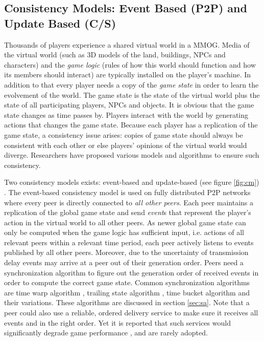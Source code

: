 \documentclass{article}
\begin{document}
\subsection{Consistency Models: Event Based (P2P) and Update Based (C/S)}
\label{sec:cm}
Thousands of players experience a shared virtual world in a MMOG. Media of the virtual world (such as 3D models of the land, buildings, NPCs and characters) and the \emph{game logic} (rules of how this world should function and how its members should interact) are typically installed on the player's machine. In addition to that every player needs a copy of the \emph{game state} in order to learn the evolvement of the world. The game state is the state of the virtual world plus the state of all participating players, NPCs and objects. It is obvious that the game state changes as time passes by. Players interact with the world by generating actions that changes the game state. Because each player has a replication of the game state, a consistency issue arises: copies of game state should always be consistent with each other or else players' opinions of the virtual world would diverge. Researchers have proposed various models and algorithms to ensure such consistency.

Two consistency models exists: event-based and update-based (see figure \ref{fig:cm}) \cite{Gilmore12}. The event-based consistency model is used on fully distributed P2P networks where every peer is directly connected to \emph{all other peers}. Each peer maintains a replication of the global game state and send \emph{event}s that represent the player's action in the virtual world to all other peers. As newer global game state can only be computed when the game logic has sufficient input, i.e. actions of all relevant peers within a relevant time period, each peer actively listens to events published by all other peers. Moreover, due to the uncertainty of transmission delay events may arrive at a peer out of their generation order. Peers need a synchronization algorithm to figure out the generation order of received events in order to compute the correct game state. Common synchronization algorithms are time warp algorithm \cite{Fujimoto99}, trailing state algorithm \cite{Cronin04}, time bucket algorithm \cite{Gautier98, Diot99} and their variations. These algorithms are discussed in section \ref{sec:sa}.
Note that a peer could also use a reliable, ordered delivery service to make sure it receives all events and in the right order. Yet it is reported that such services would significantly degrade game performance \cite{Fgame}, and are rarely adopted. %
\end{document}
